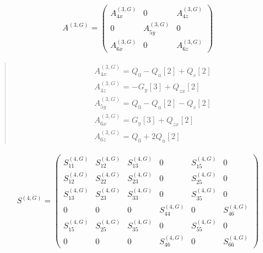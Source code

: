 \documentclass[fleqn,10pt]{jsarticle}
\begin{document}
\begin{align*}
A^{(3,G)} = \begin{pmatrix} A^{(3,G)}_{4x} & 0 & A^{(3,G)}_{4z} \\ 0 & A^{(3,G)}_{5y} & 0 \\ A^{(3,G)}_{6x} & 0 & A^{(3,G)}_{6z} \end{pmatrix}
\end{align*}
\begin{quote}
\begin{align*}
& A^{(3,G)}_{4x} = Q_{0} - Q_{u}[2] + Q_{v}[2] \\
& A^{(3,G)}_{4z} = - G_{y}[3] + Q_{zx}[2] \\
& A^{(3,G)}_{5y} = Q_{0} - Q_{u}[2] - Q_{v}[2] \\
& A^{(3,G)}_{6x} = G_{y}[3] + Q_{zx}[2] \\
& A^{(3,G)}_{6z} = Q_{0} + 2 Q_{u}[2]
\end{align*}
\end{quote}
\begin{align*}
S^{(4,G)} = \begin{pmatrix} S^{(4,G)}_{11} & S^{(4,G)}_{12} & S^{(4,G)}_{13} & 0 & S^{(4,G)}_{15} & 0 \\ S^{(4,G)}_{12} & S^{(4,G)}_{22} & S^{(4,G)}_{23} & 0 & S^{(4,G)}_{25} & 0 \\ S^{(4,G)}_{13} & S^{(4,G)}_{23} & S^{(4,G)}_{33} & 0 & S^{(4,G)}_{35} & 0 \\ 0 & 0 & 0 & S^{(4,G)}_{44} & 0 & S^{(4,G)}_{46} \\ S^{(4,G)}_{15} & S^{(4,G)}_{25} & S^{(4,G)}_{35} & 0 & S^{(4,G)}_{55} & 0 \\ 0 & 0 & 0 & S^{(4,G)}_{46} & 0 & S^{(4,G)}_{66} \end{pmatrix}
\end{align*}
\end{document}
